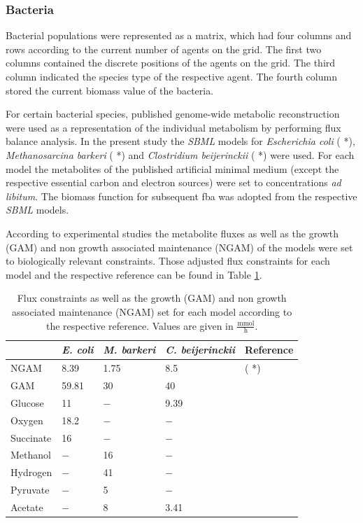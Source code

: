 \subsubsection{Bacteria}
Bacterial populations were represented as a matrix, which had four columns and rows according to the current number of agents on the grid. The first two columns contained the discrete positions of the agents on the grid. The third column indicated the species type of the respective agent. The fourth column stored the current biomass value of the bacteria.

For certain bacterial species, published genome-wide metabolic reconstruction were used as a representation of the individual metabolism by performing flux balance analysis. In the present study the \textit{SBML} models for \emph{Escherichia coli} ( *), \emph{Methanosarcina barkeri} ( *) and \emph{Clostridium beijerinckii} ( *) were used. For each model the metabolites of the published artificial minimal medium (except the respective essential carbon and electron sources) were set to concentrations \emph{ad libitum}. The biomass function for subsequent fba was adopted from the respective \textit{SBML} models. 

According to experimental studies the metabolite fluxes as well as the growth (GAM) and non growth associated maintenance (NGAM) of the models were set to biologically relevant constraints. Those adjusted flux constraints for each model and the respective reference can be found in Table \hyperref[ab:const]{\ref{tab:const}}.

\begin{table}[h!]\centering\footnotesize
\caption{Flux constraints as well as the growth (GAM) and non growth associated maintenance (NGAM) set for each model according to the respective reference. Values are given in $\frac{\mathrm{mmol}}{\mathrm{h}}$.}
\begin{tabular}{lllll}
\toprule
 & \emph{E. coli} & \emph{M. barkeri} & \emph{C. beijerinckii} & Reference\\
\midrule
NGAM & 8.39 & 1.75 & 8.5 & ( *)\\
GAM & 59.81 & 30 & 40 & \\
Glucose & 11 & $-$ & 9.39 &\\
Oxygen & 18.2 & $-$ & $-$ &\\
Succinate & 16 & $-$ & $-$ &\\
Methanol & $-$ & 16 & $-$ &\\
Hydrogen & $-$ & 41 & $-$ &\\
Pyruvate & $-$ & 5 & $-$ &\\
Acetate & $-$ & 8 & 3.41 &\\
\bottomrule 
\end{tabular} 
\label{tab:const}
\end{table}

